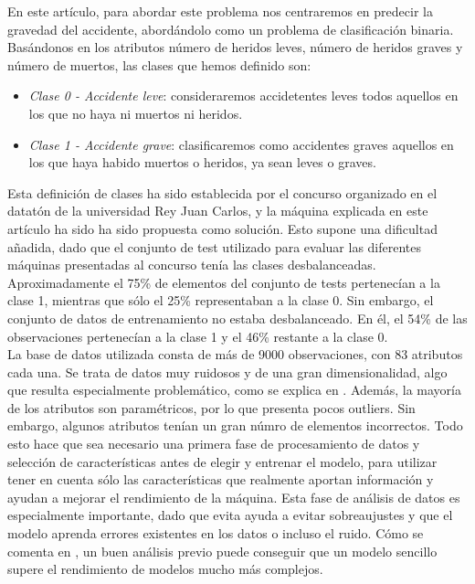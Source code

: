 \documentclass[journal,twoside]{JoPhA}
\begin{document}

En este artículo, para abordar este problema nos centraremos en predecir la gravedad del accidente, abordándolo como un problema de clasificación binaria. Basándonos en los atributos número de heridos leves, número de heridos graves y número de muertos, las clases que hemos definido son: \\

\begin{itemize}
	\item \textit{Clase 0 - Accidente leve}: consideraremos accidetentes leves todos aquellos en los que no haya ni muertos ni heridos.
	\item \textit{Clase 1 - Accidente grave}: clasificaremos como accidentes graves aquellos en los que haya habido muertos o heridos, ya sean leves o graves.
\end{itemize}

Esta definición de clases ha sido establecida por el concurso organizado en el datatón de la universidad Rey Juan Carlos, y la máquina explicada en este artículo ha sido ha sido propuesta como solución. Esto supone una dificultad añadida, dado que el conjunto de test utilizado para evaluar las diferentes máquinas presentadas al concurso tenía las clases desbalanceadas. Aproximadamente el 75\% de elementos del conjunto de tests pertenecían a la clase 1, mientras que sólo el 25\% representaban a la clase 0. Sin embargo, el conjunto de datos de entrenamiento no estaba desbalanceado. En él, el 54\% de las observaciones pertenecían a la clase 1 y el 46\% restante a la clase 0. \\

La base de datos utilizada consta de más de 9000 observaciones, con 83 atributos cada una. Se trata de datos muy ruidosos y de una gran dimensionalidad, algo que resulta especialmente problemático, como se explica en \cite{alta_dimensionalidad}. Además, la mayoría de los atributos son paramétricos, por lo que presenta pocos outliers. Sin embargo, algunos atributos tenían un gran númro de elementos incorrectos. Todo esto hace que sea necesario una primera fase de procesamiento de datos y selección de características antes de elegir y entrenar el modelo, para utilizar tener en cuenta sólo las características que realmente aportan información y ayudan a mejorar el rendimiento de la máquina. Esta fase de análisis de datos es especialmente importante, dado que evita ayuda a evitar sobreaujustes y que el modelo aprenda errores existentes en los datos o incluso el ruido. Cómo se comenta en \cite{extraccion_datos}, un buen análisis previo puede conseguir que un modelo sencillo supere el rendimiento de modelos mucho más complejos. \\
\end{document}
